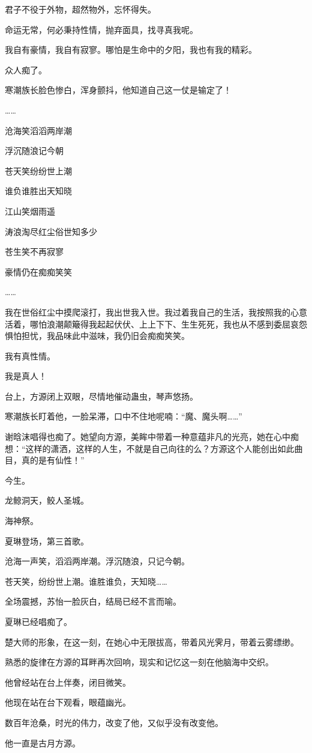 \begin{this_body}
君子不役于外物，超然物外，忘怀得失。

命运无常，何必秉持性情，抛弃面具，找寻真我呢。

我自有豪情，我自有寂寥。哪怕是生命中的夕阳，我也有我的精彩。

众人痴了。

寒潮族长脸色惨白，浑身颤抖，他知道自己这一仗是输定了！

……

沧海笑滔滔两岸潮

浮沉随浪记今朝

苍天笑纷纷世上潮

谁负谁胜出天知晓

江山笑烟雨遥

涛浪淘尽红尘俗世知多少

苍生笑不再寂寥

豪情仍在痴痴笑笑

……

我在世俗红尘中摸爬滚打，我出世我入世。我过着我自己的生活，我按照我的心意活着，哪怕浪潮颠簸得我起起伏伏、上上下下、生生死死，我也从不感到委屈哀怨惧怕担忧，我品味此中滋味，我仍旧会痴痴笑笑。

我有真性情。

我是真人！

台上，方源闭上双眼，尽情地催动蛊虫，琴声悠扬。

寒潮族长盯着他，一脸呆滞，口中不住地呢喃：“魔、魔头啊……”

谢晗沫唱得也痴了。她望向方源，美眸中带着一种意蕴非凡的光亮，她在心中痴想：“这样的潇洒，这样的人生，不就是自己向往的么？方源这个人能创出如此曲目，真的是有仙性！”

今生。

龙鲸洞天，鲛人圣城。

海神祭。

夏琳登场，第三首歌。

沧海一声笑，滔滔两岸潮。浮沉随浪，只记今朝。

苍天笑，纷纷世上潮。谁胜谁负，天知晓……

全场震撼，苏怡一脸灰白，结局已经不言而喻。

夏琳已经唱痴了。

楚大师的形象，在这一刻，在她心中无限拔高，带着风光霁月，带着云雾缥缈。

熟悉的旋律在方源的耳畔再次回响，现实和记忆这一刻在他脑海中交织。

他曾经站在台上伴奏，闭目微笑。

他现在站在台下观看，眼蕴幽光。

数百年沧桑，时光的伟力，改变了他，又似乎没有改变他。

他一直是古月方源。

\end{this_body}

